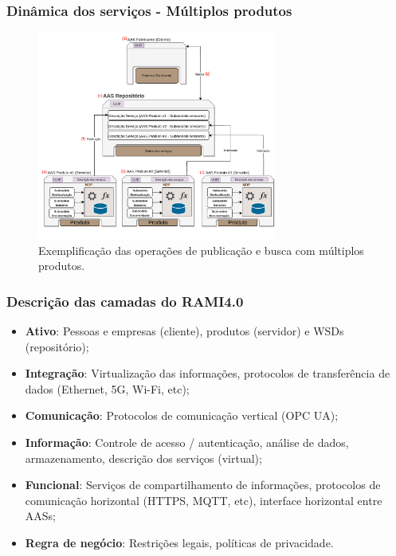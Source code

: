 \documentclass[10pt]{beamer}
\begin{document}
\begin{frame}
	\frametitle{Dinâmica dos serviços - Múltiplos produtos}
	
	\begin{figure}[htb]
		\centering
		\caption{Exemplificação das operações de publicação e busca com múltiplos produtos.}
		\label{fig:webservice-multiproduto}
		\includegraphics[width=0.7\textwidth]{webservice-multiproduto}
	\end{figure}
	
\end{frame}
\begin{frame}
	\frametitle{Descrição das camadas do RAMI4.0}
	
	\begin{itemize}
		\item \textbf{Ativo}: Pessoas e empresas (cliente), produtos (servidor) e WSDs (repositório); 
		\item \textbf{Integração}: Virtualização das informações, protocolos de transferência de dados (Ethernet, 5G, Wi-Fi, etc); 
		\item \textbf{Comunicação}: Protocolos de comunicação vertical (OPC UA); 
		\item \textbf{Informação}: Controle de acesso / autenticação, análise de dados, armazenamento, descrição dos serviços (virtual);
		\item \textbf{Funcional}: Serviços de compartilhamento de informações, protocolos de comunicação horizontal (HTTPS, MQTT, etc), interface horizontal entre AASs; 
		\item \textbf{Regra de negócio}: Restrições legais, políticas de privacidade.
	\end{itemize}
	
\end{frame}
\end{document}
